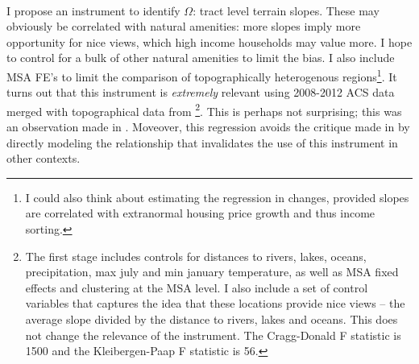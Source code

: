 \documentclass[]{article}
\begin{document}
 \paragraph*{}
 I propose an instrument to identify $\Omega$: tract level terrain slopes. These may obviously be correlated with natural amenities: more slopes imply more opportunity for nice views, which high income households may value more. I hope to control for a bulk of other natural amenities to limit the bias. I also include MSA FE's to limit the comparison of topographically heterogenous regions\footnote{I could also think about estimating the regression in changes, provided slopes are correlated with extranormal housing price growth and thus income sorting. }. It turns out that this instrument is \textit{extremely} relevant using 2008-2012 ACS data merged with topographical data from \cite{LeeandLin}\footnote{The first stage includes controls for distances to rivers, lakes, oceans, precipitation, max july and min january temperature, as well as MSA fixed effects and clustering at the MSA level. I also include a set of control variables that captures the idea that these locations provide nice views -- the average slope divided by the distance to rivers, lakes and oceans. This does not change the relevance of the instrument. The Cragg-Donald F statistic is 1500 and the Kleibergen-Paap F statistic is 56.}. This is perhaps not surprising; this was an observation made in \cite{saiz2010}. Moveover, this regression avoids the critique made in \cite{davidoffcritique} by directly modeling the relationship that invalidates the use of this instrument in other contexts. 
 


\newpage
\scriptsize

\end{document}

